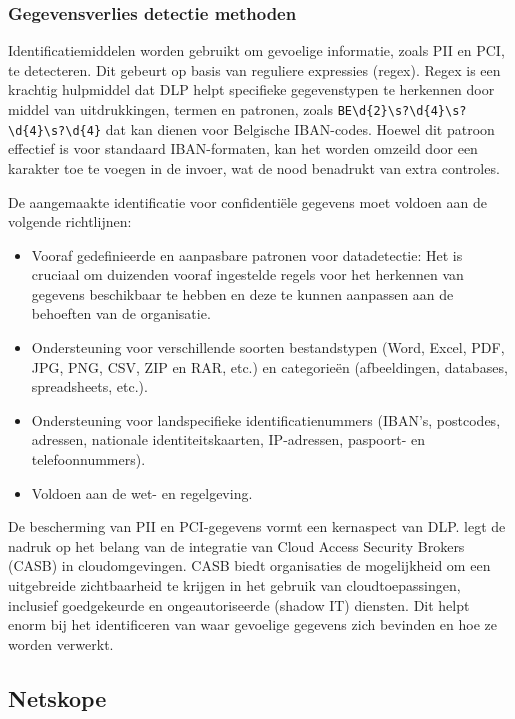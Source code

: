 \subsubsection{Gegevensverlies detectie methoden}

Identificatiemiddelen worden gebruikt om gevoelige informatie, zoals PII en PCI, te detecteren. Dit gebeurt op basis van reguliere expressies (regex). Regex is een krachtig hulpmiddel dat DLP helpt specifieke gegevenstypen te herkennen door middel van uitdrukkingen, termen en patronen, zoals \texttt{BE\textbackslash d\{2\}\textbackslash s?\textbackslash d\{4\}\textbackslash s?\textbackslash d\{4\}\textbackslash s?\textbackslash d\{4\}} dat kan dienen voor Belgische IBAN-codes. Hoewel dit patroon effectief is voor standaard IBAN-formaten, kan het worden omzeild door een karakter toe te voegen in de invoer, wat de nood benadrukt van extra controles. 

De aangemaakte identificatie voor confidentiële gegevens moet voldoen aan de volgende richtlijnen:

\begin{itemize}
    \item Vooraf gedefinieerde en aanpasbare patronen voor datadetectie: Het is cruciaal om duizenden vooraf ingestelde regels voor het herkennen van gegevens beschikbaar te hebben en deze te kunnen aanpassen aan de behoeften van de organisatie.
    \item Ondersteuning voor verschillende soorten bestandstypen (Word, Excel, PDF, JPG, PNG, CSV, ZIP en RAR, etc.) en categorieën (afbeeldingen, databases, spreadsheets, etc.).
    \item Ondersteuning voor landspecifieke identificatienummers (IBAN's, postcodes, adressen, nationale identiteitskaarten, IP-adressen, paspoort- en telefoonnummers).
    \item Voldoen aan de wet- en regelgeving.
\end{itemize}

De bescherming van PII en PCI-gegevens vormt een kernaspect van DLP. \textcite{Wason2020CASB} legt de nadruk op het belang van de integratie van Cloud Access Security Brokers (CASB) in cloudomgevingen. CASB biedt organisaties de mogelijkheid om een uitgebreide zichtbaarheid te krijgen in het gebruik van cloudtoepassingen, inclusief goedgekeurde en ongeautoriseerde (shadow IT) diensten. Dit helpt enorm bij het identificeren van waar gevoelige gegevens zich bevinden en hoe ze worden verwerkt.

\subsection{Netskope}%

